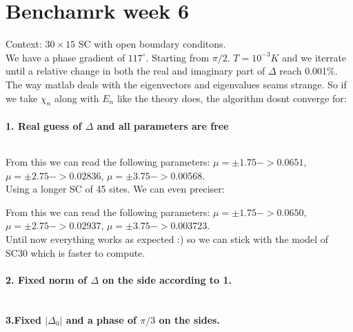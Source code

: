 \documentclass[../main.tex]{subfiles}
\begin{document}
\section{Benchamrk week 6}
Context: $30\times 15$ SC with open boundary conditons.\\

We have a phase gradient of $117^{\circ}$. Starting from $\pi/2$. $T=10^{-3}K$ and we iterrate until a relative
change in both the real and imaginary part of $\Delta$ reach 0.001\%. \\

The way matlab deals with the eigenvectors and eigenvalues seams strange. So if we take $\chi_n$ along with $E_n$
like the theory does, the algorithm dosnt converge for: 
\paragraph{1. Real guess of $\Delta$ and all parameters are free}$~$\\
\begin{figure}[H]
    \centering
    
    \caption{}
\end{figure}
From this we can read the following parameters: $\mu = \pm 1.75 -> 0.0651$, $\mu = \pm 2.75 -> 0.02836$, $\mu = \pm 3.75 -> 0.00568$.
\\
Using a longer SC of 45 sites. We can even preciser:
\begin{figure}[H]
    \centering
    
    \caption{}
\end{figure}
From this we can read the following parameters: $\mu = \pm 1.75 -> 0.0650$, $\mu = \pm 2.75 -> 0.02937$, $\mu = \pm 3.75 -> 0.003723$.
\\
Until now everything works as expected :) so we can stick with the model of SC30 which is faster to compute.\\

\paragraph{2. Fixed norm of $\Delta$ on the side according to 1.}$~$\\
\begin{figure}[H]
    \centering
    
    \caption{}
\end{figure}

\paragraph{3.Fixed $|\Delta_0|$ and a phase of $\pi/3$ on the sides.}$~$\\
\begin{figure}[H]
    \centering
    
    \caption{}
\end{figure}
\end{document}
